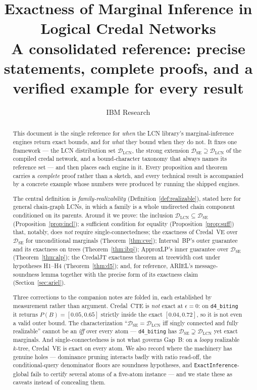 \documentclass[11pt]{article}
\title{Exactness of Marginal Inference in Logical Credal Networks\\
\large A consolidated reference: precise statements, complete proofs,
and a verified example for every result}
\author{IBM Research}
\date{}
\theoremstyle{definition}
\newcommand{\DSE}{\mathcal{D}_{\mathrm{SE}}}
\newcommand{\DLCN}{\mathcal{D}_{\mathrm{LCN}}}
\begin{document}
\maketitle

\begin{abstract}
This document is the single reference for \emph{when} the LCN library's marginal-inference engines
return exact bounds, and for \emph{what} they bound when they do not. It fixes one framework --- the
LCN distribution set $\DLCN$, the strong extension $\DSE\supseteq\DLCN$ of the compiled credal
network, and a bound-character taxonomy that always names its reference set --- and then places each
engine in it. Every proposition and theorem carries a \emph{complete} proof rather than a sketch, and
every technical result is accompanied by a concrete example whose numbers were produced by running
the shipped engines.

The central definition is \emph{family-realizability} (Definition~\ref{def:realizable}), stated here
for general chain-graph LCNs, in which a family is a whole undirected chain component conditioned on
its parents. Around it we prove: the inclusion $\DLCN\subseteq\DSE$ (Proposition~\ref{prop:incl});
a sufficient condition for equality (Proposition~\ref{prop:suff}) that, notably, does \emph{not}
require single-connectedness; the exactness of Credal~VE over $\DSE$ for unconditional marginals
(Theorem~\ref{thm:cve}); Interval~BP's outer guarantee and its exactness on trees
(Theorem~\ref{thm:ibp}); ApproxLP's inner guarantee over $\DSE$ (Theorem~\ref{thm:alp}); the
CredalJT exactness theorem at treewidth cost under hypotheses H1--H4 (Theorem~\ref{thm:d5}); and,
for reference, ARIEL's message-soundness lemma together with the precise form of its exactness
claim (Section~\ref{sec:ariel}).

Three corrections to the companion notes are folded in, each established by measurement rather than
argument. Credal~CTE is \emph{not} exact at $\epsilon{=}0$: on \texttt{d4\_biting} it returns
$P(B)=[0.05,0.65]$ strictly inside the exact $[0.04,0.72]$, so it is not even a valid outer bound.
The characterization ``$\DSE{=}\DLCN$ iff singly connected and fully realizable'' cannot be an
\emph{iff} over every atom --- \texttt{d4\_biting} has $\DSE\supsetneq\DLCN$ yet exact marginals.
And single-connectedness is not what governs Gap~B: on a \emph{loopy} realizable $k$-tree, Credal~VE
is exact on every atom. We also record where the machinery has genuine holes --- dominance pruning
interacts badly with ratio read-off, the conditional-query denominator floors are soundness
hypotheses, and \texttt{ExactInference}-global fails to certify several atoms of a five-atom
instance --- and we state these as caveats instead of concealing them.
\end{abstract}
\end{document}
